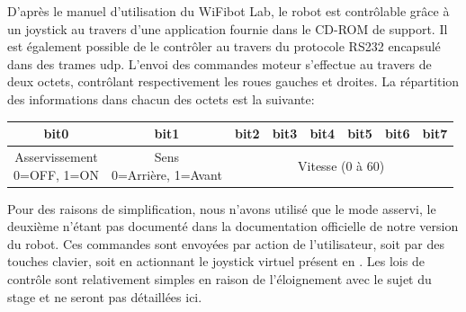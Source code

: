 			D'après le manuel d'utilisation du WiFibot Lab\cite{wifibot}, le robot est contrôlable grâce à un joystick au travers d'une application fournie dans le CD-ROM de support. Il est également possible de le contrôler au travers du protocole RS232\cite{rs232} encapsulé dans des trames \gls{udp}. L'envoi des commandes moteur s'effectue au travers de deux octets, contrôlant respectivement les roues gauches et droites. La répartition des informations dans chacun des octets est la suivante:
			\begin{center}
				\scriptsize
				\begin{tabular}[h]{|c||c||c|c|c|c|c|c|}
					\toprule
					bit0 & bit1 & bit2 & bit3 & bit4 & bit5 & bit6 & bit7 \\
					\midrule
					\specialcell{Asservissement\\ 0=OFF, 1=ON} &
					\specialcell{Sens\\ 0=Arrière, 1=Avant} &
					\multicolumn{6}{c|}{Vitesse (0 à 60)} \\
					\bottomrule
				\end{tabular}
			\end{center}
			Pour des raisons de simplification, nous n'avons utilisé que le mode asservi, le deuxième n'étant pas documenté dans la documentation officielle de notre version du robot.
			Ces commandes sont envoyées par action de l'utilisateur, soit par des touches clavier, soit en actionnant le joystick virtuel présent en \todoref.
			Les lois de contrôle sont relativement simples en raison de l'éloignement avec le sujet du stage et ne seront pas détaillées ici.
